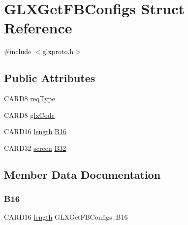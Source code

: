 \hypertarget{struct_g_l_x_get_f_b_configs}{}\section{G\+L\+X\+Get\+F\+B\+Configs Struct Reference}
\label{struct_g_l_x_get_f_b_configs}


{\ttfamily \#include $<$glxproto.\+h$>$}

\subsection*{Public Attributes}
\begin{DoxyCompactItemize}
\item 
C\+A\+R\+D8 \hyperlink{struct_g_l_x_get_f_b_configs_a982a93cf6875b4d9502404e6e06d276c}{req\+Type}
\item 
C\+A\+R\+D8 \hyperlink{struct_g_l_x_get_f_b_configs_a5d1d4d5f8c81ca65a264fd3bbbc2f7ee}{glx\+Code}
\item 
C\+A\+R\+D16 \hyperlink{glcorearb_8h_ab9c919755bde3b34349e23a32b4e0fa7}{length} \hyperlink{struct_g_l_x_get_f_b_configs_a0bf7549ad5efc7dd2eaa219d1b5142d1}{B16}
\item 
C\+A\+R\+D32 \hyperlink{cad_8h_ae04e09e4e3831bfc1632c509ae37dcec}{screen} \hyperlink{struct_g_l_x_get_f_b_configs_afa21a1320b4060d0f5cd84cf84c3178b}{B32}
\end{DoxyCompactItemize}


\subsection{Member Data Documentation}
\mbox{\label{struct_g_l_x_get_f_b_configs_a0bf7549ad5efc7dd2eaa219d1b5142d1}} 
\subsubsection{\texorpdfstring{B16}{B16}}
{\footnotesize\ttfamily C\+A\+R\+D16 \hyperlink{glcorearb_8h_ab9c919755bde3b34349e23a32b4e0fa7}{length} G\+L\+X\+Get\+F\+B\+Configs\+::\+B16}

\mbox{\label{struct_g_l_x_get_f_b_configs_afa21a1320b4060d0f5cd84cf84c3178b}} 
